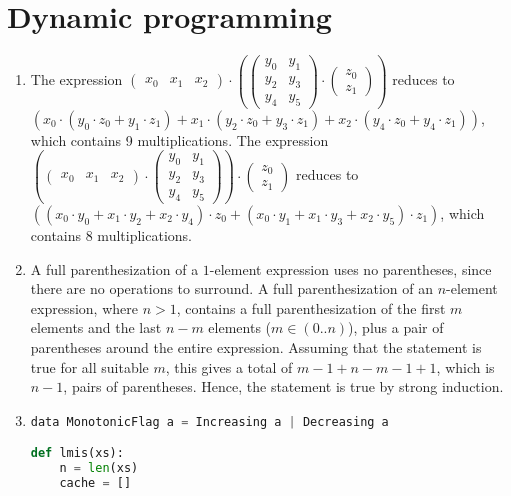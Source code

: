 \documentclass[11pt]{article}
\begin{document}
\section{Dynamic programming}
\begin{enumerate}
\item The expression \(\begin{pmatrix}x_0&x_1&x_2\end{pmatrix}\cdot\left(\begin{pmatrix}y_0&y_1\\y_2&y_3\\y_4&y_5\end{pmatrix}\cdot\begin{pmatrix}z_0\\z_1\end{pmatrix}\right)\) reduces to \((x_0\cdot(y_0\cdot z_0+y_1\cdot z_1)+x_1\cdot(y_2\cdot z_0+y_3\cdot z_1)+x_2\cdot(y_4\cdot z_0+y_4\cdot z_1))\), which contains 9 multiplications. The expression \(\left(\begin{pmatrix}x_0&x_1&x_2\end{pmatrix}\cdot\begin{pmatrix}y_0&y_1\\y_2&y_3\\y_4&y_5\end{pmatrix}\right)\cdot\begin{pmatrix}z_0\\z_1\end{pmatrix}\) reduces to \(((x_0\cdot y_0+x_1\cdot y_2+x_2\cdot y_4)\cdot z_0+(x_0\cdot y_1+x_1\cdot y_3+x_2\cdot y_5)\cdot z_1)\), which contains 8 multiplications.
\item A full parenthesization of a \(1\)-element expression uses no parentheses, since there are no operations to surround. A full parenthesization of an \(n\)-element expression, where \(n > 1\), contains a full parenthesization of the first \(m\) elements and the last \(n - m\) elements (\(m\in(0..n)\)), plus a pair of parentheses around the entire expression. Assuming that the statement is true for all suitable \(m\), this gives a total of \(m-1+n-m-1+1\), which is \(n-1\), pairs of parentheses. Hence, the statement is true by strong induction.
\item \begin{minipage}[t]{\linewidth}\begin{lstlisting}[language=python]
data MonotonicFlag a = Increasing a | Decreasing a

def lmis(xs):
    n = len(xs)
    cache = []


\end{lstlisting}
\end{minipage}
\end{enumerate}
\end{document}
